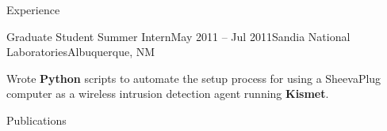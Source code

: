 \documentclass{resume} %
\begin{document}
\begin{rSection}{Experience}
\begin{rExperienceBullets}{Graduate Student Summer Intern}{May 2011 -- Jul 2011}{Sandia National Laboratories}{Albuquerque, NM}
	\item Wrote \textbf{Python} scripts to automate the setup process for using a SheevaPlug computer as a wireless intrusion detection agent running \textbf{Kismet}.

\end{rExperienceBullets}


%
%
%
%
%
%
%

\end{rSection}


\begin{rSectionHeading}{Publications}
\end{rSectionHeading}
\vspace{-3.7ex}

\end{document}
